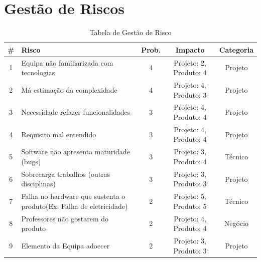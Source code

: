 \documentclass[a4paper]{report}
\begin{document}
\section{Gestão de Riscos}
\label{GR}
\begin{table}[h]
\centering
\begin{tabularx}{\textwidth}{c|X|c|c|c}
\# & Risco & Prob. & Impacto & Categoria \\ \hline
1                        & Equipa não familiarizada com tecnologias                            & 4                          & Projeto: 2, Produto: 4       & Projeto                        \\ \hline
2                        & Má estimação da complexidade                                        & 4                          & Projeto: 4, Produto: 3       & Projeto                        \\ \arrayrulecolor{red}\hline\arrayrulecolor{black}
3                        & Necessidade refazer funcionalidades                                 & 3                          & Projeto: 4, Produto: 4       & Projeto                        \\ \hline
4                        & Requisito mal entendido                                             & 3                          & Projeto: 4, Produto: 4       & Projeto                        \\ \hline
5                        & Software não apresenta maturidade (bugs)                            & 3                          & Projeto: 3, Produto: 4       & Técnico                        \\ \hline
6                        & Sobrecarga trabalhos (outras disciplinas)                           & 3                          & Projeto: 3, Produto: 3       & Projeto                        \\ \hline
7                        & Falha no hardware que sustenta o produto(Ex: Falha de eletricidade) & 2                          & Projeto: 5, Produto: 5       & Técnico                        \\ \hline
8                        & Professores não gostarem do produto                                 & 2                          & Projeto: 4, Produto: 4       & Negócio                        \\ \hline
9                        & Elemento da Equipa adoecer                                          & 2                          & Projeto: 3, Produto: 3       & Projeto   
\end{tabularx}
\caption{Tabela de Gestão de Risco}
\label{TabGR}
\end{table}
\end{document}
